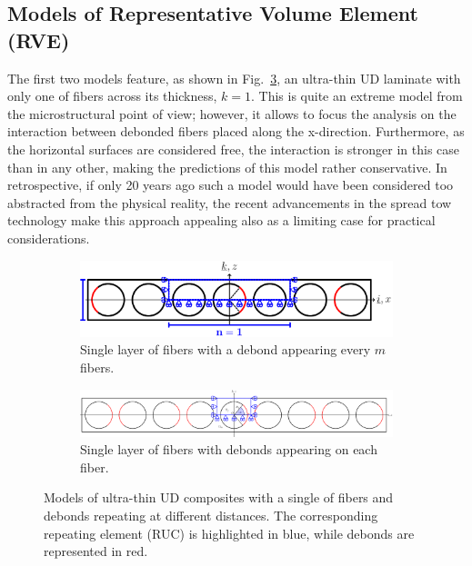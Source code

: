 \documentclass[review]{elsarticle}
\begin{document}
\subsection{Models of Representative Volume Element (RVE)}\label{subsec:rve}

The first two models feature, as shown in Fig.~\ref{fig:laminateModelsA}, an ultra-thin UD laminate with only one  of fibers across its thickness, $k=1$. This is quite an extreme model from the microstructural point of view; however, it allows to focus the analysis on the interaction between debonded fibers placed along the x-direction. Furthermore, as the horizontal surfaces are considered free, the interaction is stronger in this case than in any other, making the predictions of this model rather conservative. In retrospective, if only 20 years ago such a model would have been considered too abstracted from the physical reality, the recent advancements in the spread tow technology make this approach appealing also as a limiting case for practical considerations.

\begin{figure}[!h]
\centering
    \begin{subfigure}[b]{\textwidth}
        \includegraphics[width=\textwidth]{freeThinPly.pdf}
        \caption{Single layer of fibers with a debond appearing every $m$ fibers.}\label{subfig:freethinply}
    \end{subfigure}

    \begin{subfigure}[b]{\textwidth}
        \includegraphics[width=\textwidth]{freeThinPlyAllDebonds.pdf}
        \caption{Single layer of fibers with debonds appearing on each fiber.}\label{subfig:freethinplyalldebonds}
    \end{subfigure} 

\caption{Models of ultra-thin UD composites with a single  of fibers and debonds repeating at different distances. The corresponding repeating element (RUC) is highlighted in blue, while debonds are represented in red.}\label{fig:laminateModelsA}
\end{figure}
\end{document}
